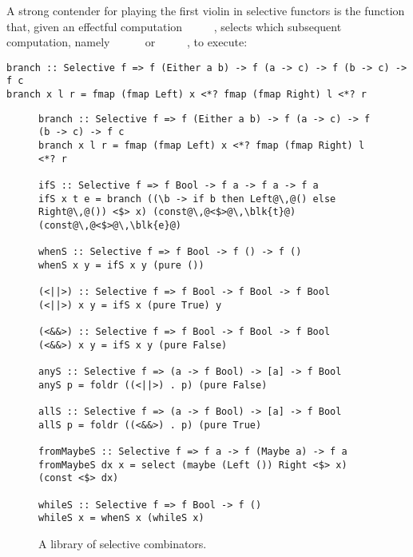 
A strong contender for playing the first violin in selective functors is the
function  that, given an effectful computation
~\hs{::}~~~~, selects which subsequent
computation, namely ~\hs{::}~~\hs{(}~\hs{->}~ or
~\hs{::}~~\hs{(}~\hs{->}~, to execute:

\vspace{1mm}
\begin{verbatim}
branch :: Selective f => f (Either a b) -> f (a -> c) -> f (b -> c) -> f c
branch x l r = fmap (fmap Left) x <*? fmap (fmap Right) l <*? r
\end{verbatim}
\vspace{1mm}
\newpage

\begin{figure}
\begin{verbatim}
branch :: Selective f => f (Either a b) -> f (a -> c) -> f (b -> c) -> f c
branch x l r = fmap (fmap Left) x <*? fmap (fmap Right) l <*? r

ifS :: Selective f => f Bool -> f a -> f a -> f a
ifS x t e = branch ((\b -> if b then Left@\,@() else Right@\,@()) <$> x) (const@\,@<$>@\,\blk{t}@) (const@\,@<$>@\,\blk{e}@)

whenS :: Selective f => f Bool -> f () -> f ()
whenS x y = ifS x y (pure ())

(<||>) :: Selective f => f Bool -> f Bool -> f Bool
(<||>) x y = ifS x (pure True) y

(<&&>) :: Selective f => f Bool -> f Bool -> f Bool
(<&&>) x y = ifS x y (pure False)

anyS :: Selective f => (a -> f Bool) -> [a] -> f Bool
anyS p = foldr ((<||>) . p) (pure False)

allS :: Selective f => (a -> f Bool) -> [a] -> f Bool
allS p = foldr ((<&&>) . p) (pure True)

fromMaybeS :: Selective f => f a -> f (Maybe a) -> f a
fromMaybeS dx x = select (maybe (Left ()) Right <$> x) (const <$> dx)

whileS :: Selective f => f Bool -> f ()
whileS x = whenS x (whileS x)
\end{verbatim}
\caption{A library of selective combinators.}
\label{fig-library}
\end{figure}

